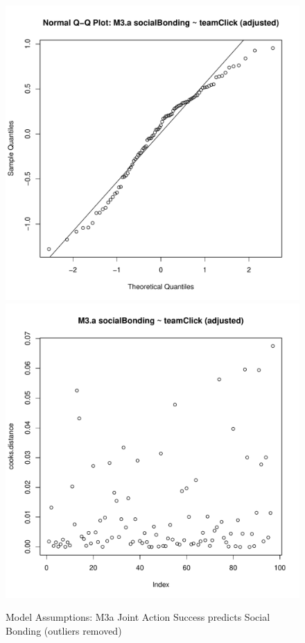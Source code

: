 {\begin{figure}[htbp]
  \includegraphics[scale =.4]{images/MLM3aOutQQNorm.pdf}
  \includegraphics[scale =.4]{images/MLM3aOutCooksD.pdf}
  \caption{Model Assumptions: M3a Joint Action Success predicts Social Bonding (outliers removed)}
  \label{fig:MLM3aOutAssumptions}
\end{figure}

}
